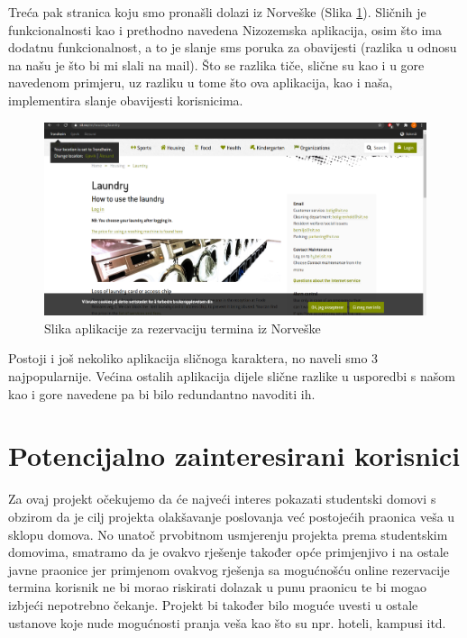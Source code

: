			{Treća pak stranica koju smo pronašli dolazi iz Norveške (Slika  \ref{fig:sit}). Sličnih je funkcionalnosti kao i prethodno
			navedena Nizozemska aplikacija, osim što ima dodatnu funkcionalnost, a to je slanje sms poruka za
			obavijesti (razlika u odnosu na našu je što bi mi slali na mail). Što se razlika tiče, slične su kao i u gore
			navedenom primjeru, uz razliku u tome što ova aplikacija, kao i naša, implementira slanje obavijesti
			korisnicima. }
		
			\begin{figure}[H]
				\includegraphics[width=.9\linewidth]{slike/SIT.PNG}
				\caption{Slika aplikacije za rezervaciju termina iz Norveške}
				\label{fig:sit}
			\end{figure}
		
			{Postoji i još nekoliko aplikacija sličnoga karaktera, no naveli smo 3 najpopularnije. Većina ostalih
			aplikacija dijele slične razlike u usporedbi s našom kao i gore navedene pa bi bilo redundantno navoditi
			ih.}
			
		\section{Potencijalno zainteresirani korisnici}
			
			{Za ovaj projekt očekujemo da će najveći interes pokazati studentski domovi s obzirom da je cilj projekta
			olakšavanje poslovanja već postojećih praonica veša u sklopu domova. No unatoč prvobitnom
			usmjerenju projekta prema studentskim domovima, smatramo da je ovakvo rješenje također opće
			primjenjivo i na ostale javne praonice jer primjenom ovakvog rješenja sa mogućnošću online rezervacije
			termina korisnik ne bi morao riskirati dolazak u punu praonicu te bi mogao izbjeći nepotrebno čekanje.
			Projekt bi također bilo moguće uvesti u ostale ustanove koje nude mogućnosti pranja veša kao što su
			npr. hoteli, kampusi itd.}	
		
